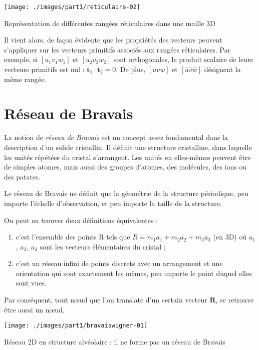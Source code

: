 \begin{marginfigure}
    \texttt{[image: ./images/part1/reticulaire-02]}
    \caption{Représentation de différentes rangées réticulaires dans une maille 3D}
    \label{fig:rangees3D}
\end{marginfigure}

Il vient alors, de façon évidente que les propriétés des vecteurs peuvent 
s'appliquer sur les vecteurs primitifs associés aux rangées réticulaires. Par
exemple, si $[u_1v_1w_1]$ et $[u_2v_2w_2]$ sont orthogonales, le produit 
scalaire de leurs vecteurs primitifs est nul :
$\mathbf{t}_1 \cdot \mathbf{t}_2 = 0$. De plus, $[uvw]$ et 
$[\bar{u}\bar{v}\bar{w}]$ désignent la même rangée.

\section{Réseau de Bravais}

La notion de \emph{réseau de Bravais} est un concept assez fondamental dans la
description d'un solide cristallin. Il définit une structure cristalline, dans
laquelle les unités répétées du cristal s'arrangent. Les unités en elles-mêmes
peuvent être de simples atomes, mais aussi des groupes d'atomes, des molécules,
des ions ou des patates.

Le réseau de Bravais ne définit que la géométrie de la structure périodique,
peu importe l'échelle d'observation, et peu importe la taille de la structure.

On peut en trouver deux définitions équivalentes :
\begin{enumerate}
    \item \label{bravaisa} c'est l'ensemble des points R tels que
    $R = m_1 a_1 + m_2 a_2 + m_3 a_3$ (en 3D) où $a_1$, $a_2$, $a_3$ sont les
    vecteurs élémentaires du cristal ;
\item c'est un réseau infini de points discrets avec un arrangement et une
    orientation qui sont exactement les mêmes, peu importe le point duquel elles
     sont vues.
\end{enumerate}

Par conséquent, tout nœud que l'on translate d'un certain vecteur 
$\mathbf{R}$, se retrouve être aussi un nœud.

\begin{marginfigure}
    \texttt{[image: ./images/part1/bravaiswigner-01]}
    \caption{Réseau 2D en structure alvéolaire : il ne forme pas un réseau de Bravais}
    \label{fig:alveolaire}
\end{marginfigure}

